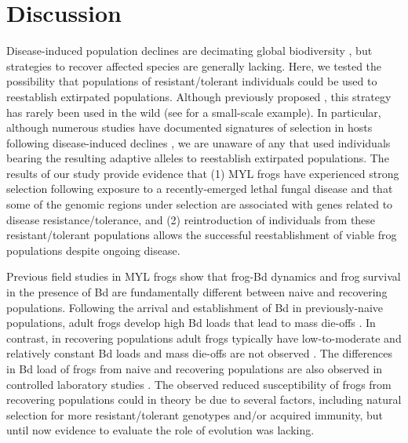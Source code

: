 \documentclass[9pt,twocolumn,twoside,lineno]{pnas-new}
\begin{document}
\section*{Discussion}

Disease-induced population declines are decimating global biodiversity
\citep{daszak2000}, but strategies to recover affected species are
generally lacking. Here, we tested the possibility that populations of
resistant/tolerant individuals could be used to reestablish extirpated
populations. Although previously proposed
\citep{mendelson2019, scheele2021}, this strategy has rarely been used
in the wild (see \citep{joseph2018} for a small-scale example). In
particular, although numerous studies have documented signatures of
selection in hosts following disease-induced declines
\citep[e.g.,][]{epstein2016, gignoux-wolfsohn2021}, we are unaware of
any that used individuals bearing the resulting adaptive alleles to
reestablish extirpated populations. The results of our study provide
evidence that (1) MYL frogs have experienced strong selection following
exposure to a recently-emerged lethal fungal disease and that some of
the genomic regions under selection are associated with genes related to
disease resistance/tolerance, and (2) reintroduction of individuals from
these resistant/tolerant populations allows the successful
reestablishment of viable frog populations despite ongoing disease.

Previous field studies in MYL frogs show that frog-Bd dynamics and frog
survival in the presence of Bd are fundamentally different between naive
and recovering populations. Following the arrival and establishment of
Bd in previously-naive populations, adult frogs develop high Bd loads
that lead to mass die-offs \citep{vredenburg2010}. In contrast, in
recovering populations adult frogs typically have low-to-moderate and
relatively constant Bd loads and mass die-offs are not observed
\citep[see also
Figure S5]{briggs2010, knapp2011}. The
differences in Bd load of frogs from naive and recovering populations
are also observed in controlled laboratory studies \citep[Figure
4]{knapp2016}. The observed reduced susceptibility of frogs from
recovering populations could in theory be due to several factors,
including natural selection for more resistant/tolerant genotypes and/or
acquired immunity, but until now evidence to evaluate the role of
evolution was lacking.
\end{document}
